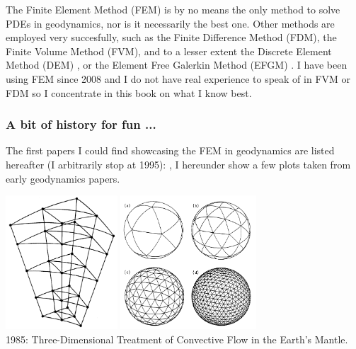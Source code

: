 The Finite Element Method (FEM) is by no means the only method 
to solve PDEs in geodynamics, nor is it necessarily the best one.
Other methods are employed very succesfully, such as the Finite Difference 
Method (FDM), the Finite Volume Method (FVM), and to a lesser extent
the Discrete Element Method (DEM) \cite{tasy05,egho07,egsc07,funi14}, 
or the Element Free Galerkin Method (EFGM) \cite{hans03}.
I have been using FEM since 2008 and I do not have real 
experience to speak of in FVM or FDM so I concentrate in this book 
on what I know best. 

\subsubsection{A bit of history for fun ... }

The first papers I could find showcasing the FEM in geodynamics are listed hereafter
(I arbitrarily stop at 1995):
\cite{gart78}, 
\cite{anbr80}\cite{mera80}
\cite{engl82}
\cite{thar85}
\cite{enho86}\cite{mofr86}
\cite{zupa86}
\cite{boww89}
\cite{brau94}
\cite{brbe95}
I hereunder show a few plots taken from early geodynamics papers.

\begin{center}
\includegraphics[height=5cm]{images/history/baum85a}
\includegraphics[height=5cm]{images/history/baum85b}\\
{\small 1985: Three-Dimensional Treatment of Convective Flow in the Earth's Mantle.
\cite{baum85}}
\end{center}

